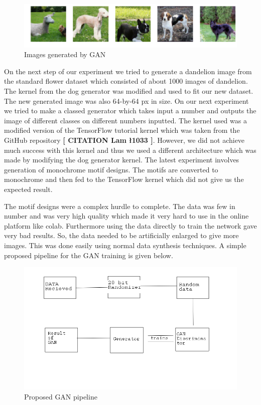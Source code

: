 \documentclass{article}
\begin{document}
    \begin{figure}[h]
        \centering
        \includegraphics[scale=0.5]{images/dogGAN.png}
        \caption{Images generated by GAN}
    \end{figure}
    On the next step of our experiment we tried to generate a dandelion image from the standard flower dataset which consisted of about 1000 images of dandelion. The kernel from the dog generator was modified and used to fit our new dataset. The new generated image was also 64-by-64 px in size.
    On our next experiment we tried to make a classed generator which takes input a number and outputs the image of different classes on different numbers inputted. The kernel used was a modified version of the TensorFlow tutorial kernel which was taken from the GitHub repository \textbf{[ CITATION Lam \l 1033 ]}. However, we did not achieve much success with this kernel and thus we used a different architecture which was made by modifying the dog generator kernel.
    The latest experiment involves generation of monochrome motif designs. The motifs are converted to monochrome and then fed to the TensorFlow kernel which did not give us the expected result.
    
    The motif designs were a complex hurdle to complete. The data was few in number and was very high quality which made it very hard to use in the online platform like colab. Furthermore using the data directly to train the network gave very bad results. So, the data needed to be artificially enlarged to give more images. This was done easily using normal data synthesis techniques. A simple proposed pipeline for the GAN training is given below.
    
    \begin{figure}[h]
        \centering
        \includegraphics{images/Generalworkflow.png}
        \caption{Proposed GAN pipeline}
    \end{figure}
    
\end{document}
